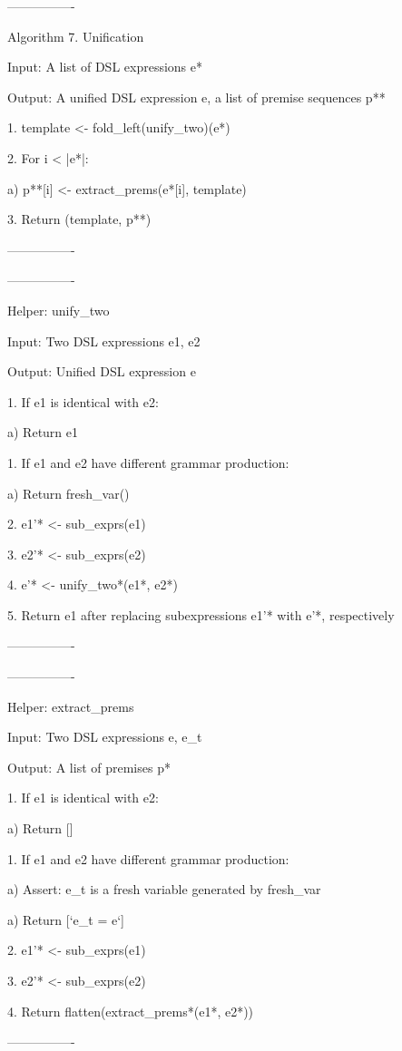 ----------------

Algorithm 7. Unification

Input: A list of DSL expressions e*

Output: A unified DSL expression e, a list of premise sequences p**

1. template <- fold\_left(unify\_two)(e*)

2. For i < |e*|:

  a) p**[i] <- extract\_prems(e*[i], template)

3. Return (template, p**)

----------------

----------------

Helper: unify\_two

Input: Two DSL expressions e1, e2

Output: Unified DSL expression e

1. If e1 is identical with e2:

  a) Return e1

1. If e1 and e2 have different grammar production:

  a) Return fresh\_var()

2. e1'* <- sub\_exprs(e1)

3. e2'* <- sub\_exprs(e2)

4. e'* <- unify\_two*(e1*, e2*)

5. Return e1 after replacing subexpressions e1'* with e'*, respectively

----------------

----------------

Helper: extract\_prems

Input: Two DSL expressions e, e\_t

Output: A list of premises p*

1. If e1 is identical with e2:

  a) Return []

1. If e1 and e2 have different grammar production:

  a) Assert: e\_t is a fresh variable generated by fresh\_var

  a) Return [`e\_t = e`]

2. e1'* <- sub\_exprs(e1)

3. e2'* <- sub\_exprs(e2)

4. Return flatten(extract\_prems*(e1*, e2*))

----------------

